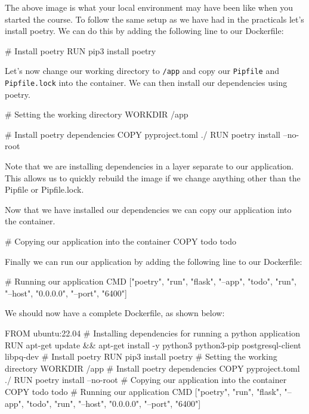 \documentclass{csse4400}
\begin{document}
The above image is what your local environment may have been like when you started the course.
To follow the same setup as we have had in the practicals let's install poetry.
We can do this by adding the following line to our Dockerfile:

\begin{code}[language=docker,numbers=none]{}
# Install poetry
RUN pip3 install poetry
\end{code}

Let's now change our working directory to \texttt{/app} and copy our \texttt{Pipfile} and \texttt{Pipfile.lock} into the container.
We can then install our dependencies using poetry.

\begin{code}[language=docker,numbers=none]{}
# Setting the working directory
WORKDIR /app

# Install poetry dependencies
COPY pyproject.toml ./
RUN poetry install --no-root
\end{code}

Note that we are installing dependencies in a layer separate to our application.
This allows us to quickly rebuild the image if we change anything other than the Pipfile or Pipfile.lock.

Now that we have installed our dependencies we can copy our application into the container.

\begin{code}[language=docker,numbers=none]{}
# Copying our application into the container
COPY todo todo
\end{code}

Finally we can run our application by adding the following line to our Dockerfile:

\begin{code}[language=docker,numbers=none]{}
# Running our application
CMD ["poetry", "run", "flask", "--app", "todo", "run", "--host", "0.0.0.0", "--port", "6400"]
\end{code}

We should now have a complete Dockerfile, as shown below:

\begin{code}[language=docker,numbers=none]{}
  FROM ubuntu:22.04
  # Installing dependencies for running a python application
  RUN apt-get update && apt-get install -y python3 python3-pip postgresql-client libpq-dev
  # Install poetry
  RUN pip3 install poetry
  # Setting the working directory
  WORKDIR /app
  # Install poetry dependencies
  COPY pyproject.toml ./
  RUN poetry install --no-root
  # Copying our application into the container
  COPY todo todo
  # Running our application
  CMD ["poetry", "run", "flask", "--app", "todo", "run", "--host", "0.0.0.0", "--port", "6400"]
\end{code}
\end{document}
